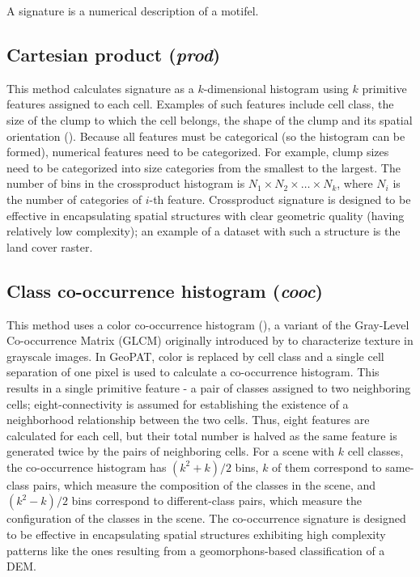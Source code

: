 A signature is a numerical description of a motifel.

\subsection{Cartesian product ({\it prod})}

This method calculates signature as a $k$-dimensional histogram using $k$ primitive features assigned to each cell. 
Examples of such features include cell class, the size of the clump to which the cell belongs, the shape of the clump and its spatial orientation (\cite{Williams2008}). 
Because all features must be categorical (so the histogram can be formed), numerical features need to be categorized. 
For example, clump sizes need to be categorized into size categories from the smallest to the largest.
The number of bins in the crossproduct histogram is $N_1 \times N_2 \times \ldots \times N_k$, where $N_i$ is the number of categories of $i$-th feature. 
Crossproduct signature is designed to be effective in encapsulating spatial structures with clear geometric quality (having relatively low complexity); an example of a dataset with such a structure is the land cover raster.

\subsection{Class co-occurrence histogram ({\it cooc})}

This method uses a color co-occurrence histogram (\cite{Barnsley1996,Chang1999}), a variant of the Gray-Level Co-occurrence Matrix (GLCM) originally introduced by \cite{Haralick1973} to characterize texture in grayscale images.
In GeoPAT, color is replaced by cell class and a single cell separation of one pixel is used to calculate a co-occurrence histogram. 
This results in a single primitive feature - a pair of classes assigned to two neighboring cells; eight-connectivity is assumed for establishing the existence of a neighborhood relationship between the two cells. 
Thus, eight features are calculated for each cell, but their total number is halved as the same feature is generated twice by the pairs of neighboring cells.
For a scene with $k$ cell classes, the co-occurrence histogram has $(k^2+k)/2$ bins, $k$ of them correspond to same-class pairs, which measure the composition of the classes in the scene, and $(k^2-k)/2$ bins correspond to different-class pairs, which measure the configuration of the classes in the scene. 
The co-occurrence signature is designed to be effective in encapsulating spatial structures exhibiting high complexity patterns like the ones resulting from a geomorphons-based classification of a DEM. 


